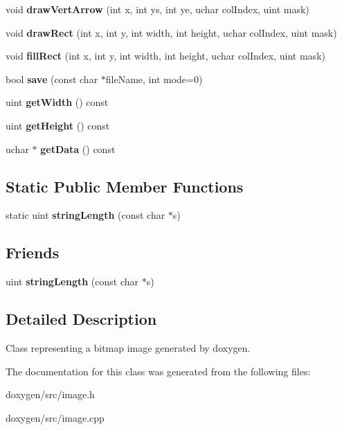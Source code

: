 \begin{DoxyCompactItemize}
void {\bfseries draw\+Vert\+Arrow} (int x, int ys, int ye, uchar col\+Index, uint mask)
\item 
\mbox{\label{class_image_ab60719f8c7153f155c6b15676b4e821f}} 
void {\bfseries draw\+Rect} (int x, int y, int width, int height, uchar col\+Index, uint mask)
\item 
\mbox{\label{class_image_a2192a6addb48198a3206f23c77922640}} 
void {\bfseries fill\+Rect} (int x, int y, int width, int height, uchar col\+Index, uint mask)
\item 
\mbox{\label{class_image_a8e4b382c51788279b5110651e36e1043}} 
bool {\bfseries save} (const char $\ast$file\+Name, int mode=0)
\item 
\mbox{\label{class_image_ab6d8174b419a99ccae9429b07362425a}} 
uint {\bfseries get\+Width} () const
\item 
\mbox{\label{class_image_a1e3c94a176f63db4a7e92887da28a156}} 
uint {\bfseries get\+Height} () const
\item 
\mbox{\label{class_image_a7d9cea65c7a8306f1c1c2173eb32dd7f}} 
uchar $\ast$ {\bfseries get\+Data} () const
\end{DoxyCompactItemize}
\subsection*{Static Public Member Functions}
\begin{DoxyCompactItemize}
\item 
\mbox{\label{class_image_a0646bebccb54e618889304a53ae93f14}} 
static uint {\bfseries string\+Length} (const char $\ast$s)
\end{DoxyCompactItemize}
\subsection*{Friends}
\begin{DoxyCompactItemize}
\item 
\mbox{\label{class_image_a89090e707a9d71c5e66300a9682cf1a8}} 
uint {\bfseries string\+Length} (const char $\ast$s)
\end{DoxyCompactItemize}


\subsection{Detailed Description}
Class representing a bitmap image generated by doxygen. 

The documentation for this class was generated from the following files\+:\begin{DoxyCompactItemize}
\item 
doxygen/src/image.\+h\item 
doxygen/src/image.\+cpp\end{DoxyCompactItemize}

